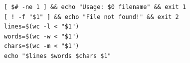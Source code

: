\begin{verbatim}
[ $# -ne 1 ] && echo "Usage: $0 filename" && exit 1
[ ! -f "$1" ] && echo "File not found!" && exit 2
lines=$(wc -l < "$1")
words=$(wc -w < "$1")
chars=$(wc -m < "$1")
echo "$lines $words $chars $1"
\end{verbatim}
